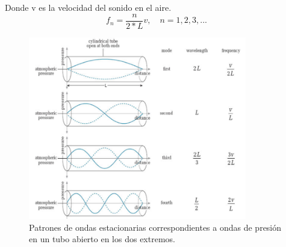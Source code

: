 \documentclass{article}
\begin{document}
Donde v es la velocidad del sonido en el aire. 
\begin{equation}
{ f }_{ n }=\frac { n }{ 2*L } v,\quad n=1,2,3,...
\end{equation}
\begin{figure}[H]
  \centering
     \includegraphics[width=0.85\textwidth]{p1}
  \caption{Patrones de ondas estacionarias correspondientes a ondas de presión en un tubo abierto en los dos extremos.}
      \label{fig:p1}
\end{figure}
\end{document}
